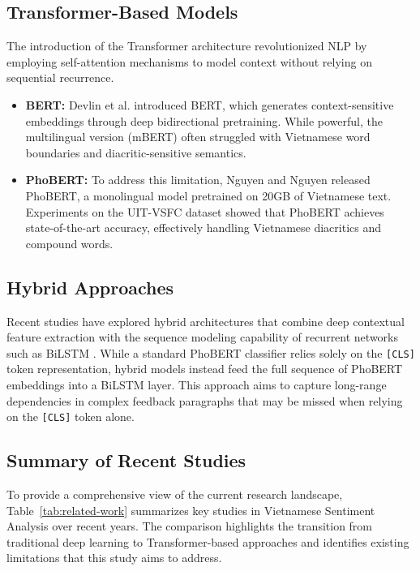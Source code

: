 \documentclass[12pt]{report} %
\begin{document}
\subsection{Transformer-Based Models}

The introduction of the Transformer architecture revolutionized NLP by employing self-attention mechanisms to model context without relying on sequential recurrence.

\begin{itemize}
    \item \textbf{BERT:} Devlin et al. \cite{devlin2019bertpretrainingdeepbidirectional} introduced BERT, which generates context-sensitive embeddings through deep bidirectional pretraining. While powerful, the multilingual version (mBERT) often struggled with Vietnamese word boundaries and diacritic-sensitive semantics.

    \item \textbf{PhoBERT:} To address this limitation, Nguyen and Nguyen \cite{nguyen2020phobertpretrainedlanguagemodels} released PhoBERT, a monolingual model pretrained on 20GB of Vietnamese text. Experiments on the UIT-VSFC dataset \cite{nguyen2018uitvsfc} showed that PhoBERT achieves state-of-the-art accuracy, effectively handling Vietnamese diacritics and compound words.
\end{itemize}

\subsection{Hybrid Approaches}

Recent studies have explored hybrid architectures that combine deep contextual feature extraction with the sequence modeling capability of recurrent networks such as BiLSTM \cite{dang2023hybrid}. While a standard PhoBERT classifier relies solely on the \texttt{[CLS]} token representation, hybrid models instead feed the full sequence of PhoBERT embeddings into a BiLSTM layer. This approach aims to capture long-range dependencies in complex feedback paragraphs that may be missed when relying on the \texttt{[CLS]} token alone.

\subsection{Summary of Recent Studies}

To provide a comprehensive view of the current research landscape, Table~\ref{tab:related-work} summarizes key studies in Vietnamese Sentiment Analysis over recent years. The comparison highlights the transition from traditional deep learning to Transformer-based approaches and identifies existing limitations that this study aims to address.
\end{document}
